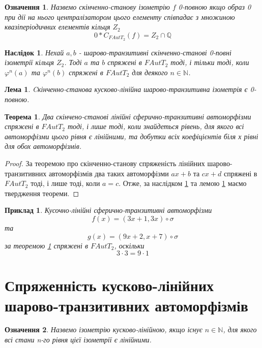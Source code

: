 \documentclass[a4paper,12pt]{article} \usepackage{a4wide}
\numberwithin{equation}{subsection}
\newtheorem{theorem}{Теорема}[subsection]
\newtheorem{lemma}{Лема}[subsection]
\newtheorem{corollary}{Наслідок}[subsection]
\newtheorem{definition}{Означення}[subsection]
\newtheorem{example}{Приклад}[subsection]
\begin{document}
 \begin{definition}
   Назвемо скінченно-станову ізометрію $f$ 0-повною якщо образ 0 при
   дії на нього централізатором цього елементу співпадає з множиною
   квазіперіодичних елементів кільця $Z_2$
$$0*C_{FAutT_2}(f) = Z_2\cap \mathbb{Q}$$
\end{definition}
 
 
\begin{corollary}\label{conj_null_full_izom}
  Нехай $a, b$ - шарово-транзитивні скінченно-станові 0-повні
  ізометрії кільця $Z_2$. Тоді $a$ та $b$ спряжені в $FAutT_2$ тоді,
  і тільки тоді, коли $\varphi^n(a)$ та $\varphi^n(b)$ спряжені в
  $FAutT_2$ для деякого $n \in \mathbb{N}$.
\end{corollary}

\begin{lemma}\label{null_full_linear_transitive}
  Cкінченно-станова кусково-лінійна шарово-транзитивна ізометрія є
  0-повною.
\end{lemma}


\begin{theorem}\label{sph_tr_part_lin_conj}
  Два скінчено-станові лінійні сферично-транзитивні автоморфізми
  спряжені в $FAutT_2$ тоді, і лише тоді, коли знайдеться рівень, для
  якого всі автоморфізми цього рівня є лінійними, та добутки всіх
  коефіцієнтів біля х рівні для обох автоморфізмів.
\end{theorem}
\begin{proof}
  За теоремою про скінченно-станову спряженість лінійних
  шарово-транзитивних автоморфізмів два таких автоморфізми $ax+b$ та
  $cx+d$ спряжені в $FAutT_2$ тоді, і лише тоді, коли $a=c$. Отже, за
  наслідком \ref{conj_null_full_izom} та лемою
  \ref{null_full_linear_transitive} маємо твердження теореми.
\end{proof}

\begin{example}
  Кусочно-лінійні сферично-транзитивні автоморфізми $$f(x)= (3x +1, 3x
  )\circ \sigma $$ та $$g(x)= (9x+2 , x+7 )\circ \sigma $$ за теоремою
  \ref{sph_tr_part_lin_conj} спряжені в $FAutT_2$, оскільки
$$3\cdot 3 = 9\cdot 1$$
\end{example}



\newpage
\section{Спряженність кусково-лінійних шарово-транзитивних
  автоморфізмів}
\begin{definition}
Назвемо ізометрію кусково-лінійною, якщо існує $n \in \mathbb{N}$, для якого всі стани n-го рівня цієї ізометрії є лінійними.
\end{definition}
\end{document}
